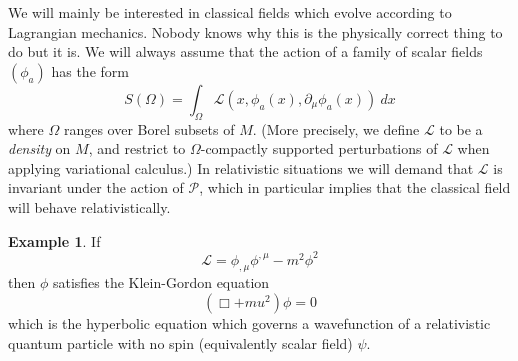 \documentclass[reqno,12pt,letterpaper]{amsart}
\newcommand{\Poin}{\mathscr P}
\theoremstyle{definition}
\newtheorem{example}[theorem]{Example}
\numberwithin{equation}{section}
\begin{document}
We will mainly be interested in classical fields which evolve according to Lagrangian mechanics.
Nobody knows why this is the physically correct thing to do but it is.
We will always assume that the action of a family of scalar fields $(\phi_a)$ has the form
$$S(\Omega) = \int_\Omega \mathcal L(x, \phi_a(x), \partial_\mu \phi_a(x)) ~dx$$
where $\Omega$ ranges over Borel subsets of $M$.
(More precisely, we define $\mathcal L$ to be a \emph{density} on $M$, and restrict to $\Omega$-compactly supported perturbations of $\mathcal L$ when applying variational calculus.)
In relativistic situations we will demand that $\mathcal L$ is invariant under the action of $\Poin$, which in particular implies that the classical field will behave relativistically.

\begin{example}
If
$$\mathcal L = \phi_{,\mu} \phi^{,\mu} - m^2 \phi^2$$
then $\phi$ satisfies the Klein-Gordon equation
$$(\Box + mu^2)\phi = 0$$
which is the hyperbolic equation which governs a wavefunction of a relativistic quantum particle with no spin (equivalently scalar field) $\psi$.
\end{example}








\printbibliography
\end{document}
